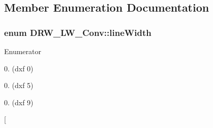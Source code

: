 \subsection{Member Enumeration Documentation}
\hypertarget{classDRW__LW__Conv_aed68cbc3d8bdf7e20003dd2d970279b3}{
\subsubsection[{line\-Width}]{\setlength{\rightskip}{0pt plus 5cm}enum {\bf D\-R\-W\-\_\-\-L\-W\-\_\-\-Conv\-::line\-Width}}}\label{classDRW__LW__Conv_aed68cbc3d8bdf7e20003dd2d970279b3}
\begin{Desc}
\item[Enumerator]\par
\begin{description}
\item[{\em 
\hypertarget{classDRW__LW__Conv_aed68cbc3d8bdf7e20003dd2d970279b3a3007c229abfe3c9f018b2a881384aa17}{width00}\label{classDRW__LW__Conv_aed68cbc3d8bdf7e20003dd2d970279b3a3007c229abfe3c9f018b2a881384aa17}
}]0.\-00mm (dxf 0) \item[{\em 
\hypertarget{classDRW__LW__Conv_aed68cbc3d8bdf7e20003dd2d970279b3a27fc91eb33b8254bd0d0fbbb4b9430cc}{width01}\label{classDRW__LW__Conv_aed68cbc3d8bdf7e20003dd2d970279b3a27fc91eb33b8254bd0d0fbbb4b9430cc}
}]0.\-05mm (dxf 5) \item[{\em 
\hypertarget{classDRW__LW__Conv_aed68cbc3d8bdf7e20003dd2d970279b3aa85257cc5f5a011103273232c4f90822}{width02}\label{classDRW__LW__Conv_aed68cbc3d8bdf7e20003dd2d970279b3aa85257cc5f5a011103273232c4f90822}
}]0.\-09mm (dxf 9) \item[{\em 
}
\end{description}
\end{Desc}
